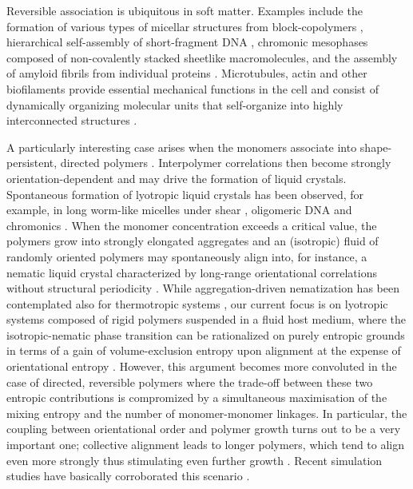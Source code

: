   Reversible association is ubiquitous in soft matter. Examples include the formation of various types of micellar structures from block-copolymers \cite{riess2003,blanazs2009}, hierarchical self-assembly of  short-fragment DNA  \cite{demichele2012,demichele2016}, chromonic mesophases  \cite{lydon2010,tamchang2008}  composed of non-covalently stacked sheetlike macromolecules, and the assembly of amyloid fibrils from individual proteins \cite{knowles2011}. Microtubules, actin and other biofilaments provide essential mechanical functions in the cell and consist of dynamically organizing molecular units that self-organize into highly interconnected structures \cite{fuchs1998}.
 
 
 
A particularly interesting case arises when the monomers associate into shape-persistent, directed polymers \cite{gittes1993}. Interpolymer correlations then become strongly orientation-dependent and may drive the formation of liquid crystals.  Spontaneous  formation of lyotropic liquid crystals has been observed, for example, in long worm-like micelles under shear  \cite{berret1994}, oligomeric DNA \cite{nakata2007} and chromonics \cite{lydon2010}. When the monomer concentration exceeds a critical value, the polymers grow into strongly elongated aggregates  and an (isotropic) fluid of randomly oriented polymers may spontaneously align into, for instance, a nematic liquid crystal characterized by long-range orientational correlations without structural periodicity \cite{gennes-prost}.  While aggregation-driven nematization has been contemplated also for thermotropic systems  \cite{matsuyama1998}, our current focus  is  on lyotropic systems composed of rigid polymers suspended in a fluid host medium, where the isotropic-nematic phase transition can be rationalized on purely entropic grounds in terms of a gain of volume-exclusion entropy upon alignment at the expense of orientational entropy \cite{onsager1949, odijkoverview,Vroege92}. However, this argument becomes more convoluted in the case  of directed, reversible polymers where the trade-off between these two entropic contributions is compromized by a simultaneous maximisation of the mixing entropy and the number of monomer-monomer linkages. In particular, the  coupling between orientational order and polymer growth turns out to be a very important one; collective alignment leads to longer polymers, which tend to align even more strongly thus stimulating even further growth \cite{vdschoot1994la}.  Recent simulation studies have basically corroborated this scenario \cite{kindt2001,kuriabova2010,nguyen2014}.

